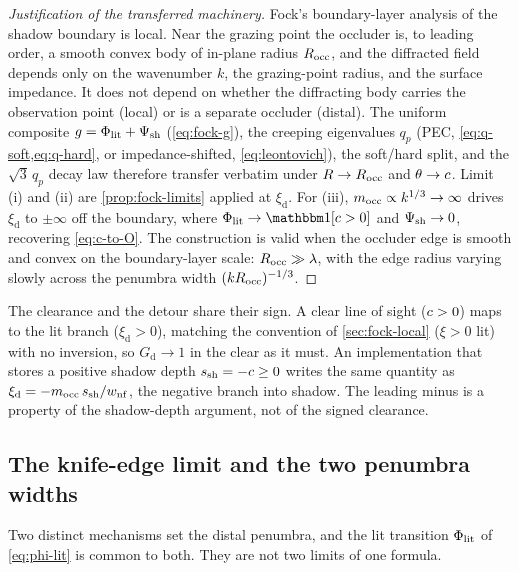 \begin{proof}[Justification of the transferred machinery]
Fock's boundary-layer analysis of the shadow boundary is local. Near the grazing
point the occluder is, to leading order, a smooth convex body of in-plane radius
$R_{\mathrm{occ}}$, and the diffracted field depends only on the wavenumber $k$, the
grazing-point radius, and the surface impedance. It does not depend on whether the
diffracting body carries the observation point (local) or is a separate occluder
(distal). The uniform composite $g=\Phi_{\mathrm{lit}}+\Psi_{\mathrm{sh}}$ (\cref{eq:fock-g}), the
creeping eigenvalues $q_p$ (PEC, \cref{eq:q-soft,eq:q-hard}, or impedance-shifted,
\cref{eq:leontovich}), the soft/hard split, and the $\sqrt3\,q_p$ decay law
therefore transfer verbatim under $R\to R_{\mathrm{occ}}$ and $\theta\to c$. Limit (i)
and (ii) are \cref{prop:fock-limits} applied at $\xi_{\mathrm d}$. For (iii),
$m_{\mathrm{occ}}\propto k^{1/3}\to\infty$ drives $\xi_{\mathrm d}$ to
$\pm\infty$ off the boundary, where $\Philit\to\ident[\clr>0]$ and $\Psi_{\mathrm{sh}}\to0$,
recovering \cref{eq:c-to-O}. The construction is valid when the occluder edge is
smooth and convex on the boundary-layer scale: $R_{\mathrm{occ}}\gg\lambda$, with the edge
radius varying slowly across the penumbra width $(kR_{\mathrm{occ}})^{-1/3}$.
\end{proof}

\begin{remark}\label{rem:distal-sign}
The clearance and the detour share their sign. A clear line of sight ($c>0$)
maps to the lit branch ($\xi_{\mathrm d}>0$), matching the convention of
\cref{sec:fock-local} ($\xi>0$ lit) with no inversion, so $G_{\mathrm d}\to1$ in
the clear as it must. An implementation that stores a positive shadow depth
$s_{\mathrm{sh}}=-c\ge0$ writes the same quantity as
$\xi_{\mathrm d}=-m_{\mathrm{occ}}\,s_{\mathrm{sh}}/w_{\mathrm{nf}}$, the
negative branch into shadow. The leading minus is a property of the shadow-depth
argument, not of the signed clearance.
\end{remark}

\subsection{The knife-edge limit and the two penumbra widths}\label{sec:cmetric-knife}

Two distinct mechanisms set the distal penumbra, and the lit transition $\Phi_{\mathrm{lit}}$
of \cref{eq:phi-lit} is common to both. They are not two limits of one formula.

